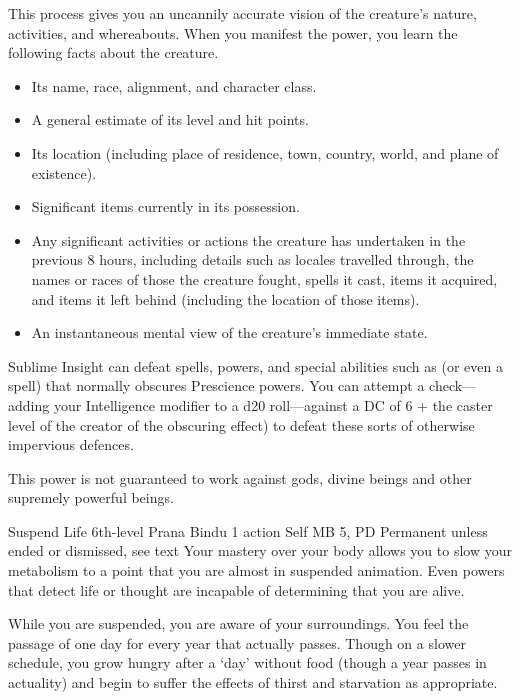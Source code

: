 This process gives you an uncannily accurate vision
of the creature's nature,
activities,
and whereabouts.
When you manifest the power,
you learn the following facts about the creature.
\begin{itemize}
  \item Its name, race, alignment, and character class.
  \item A general estimate of its level and hit points.
  \item Its location (including place of residence, town,
        country, world, and plane of existence).
  \item Significant items currently in its possession.
  \item Any significant activities or actions the creature
        has undertaken in the previous 8 hours,
        including details such as locales travelled through,
        the names or races of those the creature fought,
        spells it cast,
        items it acquired,
        and items it left behind
        (including the location of those items).
  \item An instantaneous mental view of the creature's
        immediate state.
\end{itemize}

Sublime Insight can defeat spells,
powers,
and special abilities such as 
(or even a  spell)
that normally obscures Prescience powers.
You can attempt a check---adding your
Intelligence modifier to a d20 roll---against
a DC of 6 + the caster level of the
creator of the obscuring effect)
to defeat these sorts of otherwise impervious defences.

This power is not guaranteed to work against gods, divine beings
and other supremely powerful beings.

\DndPowerHeader%
  {Suspend Life}
  {6th-level Prana Bindu}
  {1 action}
  {Self}
  {MB 5, PD \lvlsix}
  {Permanent unless ended or dismissed, see text}
Your mastery over your body allows you to slow your
metabolism to a point
that you are almost in suspended animation.
Even powers that detect life or thought are
incapable of determining that you are alive.

While you are suspended,
you are aware of your surroundings.
You feel the passage of one day
for every year that actually passes.
Though on a slower schedule,
you grow hungry after a `day' without food
(though a year passes in actuality)
and begin to suffer the effects of
thirst and starvation as appropriate.

